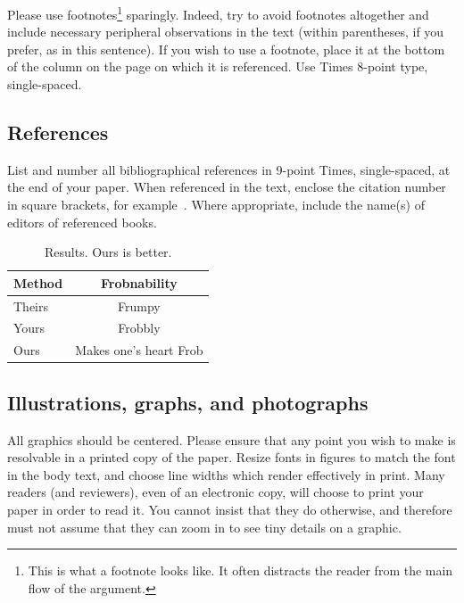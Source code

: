\documentclass[10pt,twocolumn,letterpaper]{article}
\begin{document}
Please use footnotes\footnote {This is what a footnote looks like.  It
often distracts the reader from the main flow of the argument.} sparingly.
Indeed, try to avoid footnotes altogether and include necessary peripheral
observations in
the text (within parentheses, if you prefer, as in this sentence).  If you
wish to use a footnote, place it at the bottom of the column on the page on
which it is referenced. Use Times 8-point type, single-spaced.


\subsection{References}

List and number all bibliographical references in 9-point Times,
single-spaced, at the end of your paper. When referenced in the text,
enclose the citation number in square brackets, for
example~\cite{Authors14}.  Where appropriate, include the name(s) of
editors of referenced books.

\begin{table}
\begin{center}
\begin{tabular}{|l|c|}
\hline
Method & Frobnability \\
\hline\hline
Theirs & Frumpy \\
Yours & Frobbly \\
Ours & Makes one's heart Frob\\
\hline
\end{tabular}
\end{center}
\caption{Results.   Ours is better.}
\end{table}

\subsection{Illustrations, graphs, and photographs}

All graphics should be centered.  Please ensure that any point you wish to
make is resolvable in a printed copy of the paper.  Resize fonts in figures
to match the font in the body text, and choose line widths which render
effectively in print.  Many readers (and reviewers), even of an electronic
copy, will choose to print your paper in order to read it.  You cannot
insist that they do otherwise, and therefore must not assume that they can
zoom in to see tiny details on a graphic.
\end{document}
